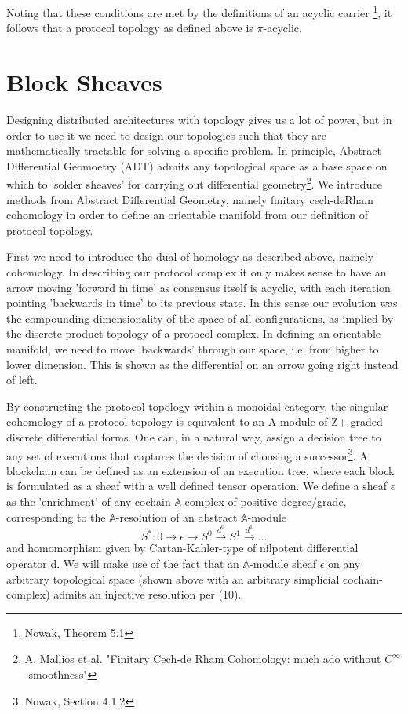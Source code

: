 \documentclass{article}
\begin{document}
Noting that these conditions are met by the definitions of an acyclic carrier \footnote{Nowak, Theorem 5.1}, it follows that a protocol topology as defined above is $\pi$-acyclic.

\section{Block Sheaves}
Designing distributed architectures with topology gives us a lot of power, but in order to use it we need to design our topologies such that they are mathematically tractable for solving a specific problem. In principle, Abstract Differential Geomoetry (ADT) admits any topological space as a base space on which to 'solder sheaves' for carrying out differential geometry\footnote{A. Mallios et al. "Finitary Cech-de Rham Cohomology: much ado without $C^{\infty}$-smoothness"}. We introduce methods from Abstract Differential Geometry, namely finitary cech-deRham cohomology in order to define an orientable manifold from our definition of protocol topology.

First we need to introduce the dual of homology as described above, namely cohomology. In describing our protocol complex it only makes sense to have an arrow moving 'forward in time' as consensus itself is acyclic, with each iteration pointing 'backwards in time' to its previous state. In this sense our evolution was the compounding dimensionality of the space of all configurations, as implied by the discrete product topology of a protocol complex. In defining an orientable manifold, we need to move 'backwards' through our  space, i.e. from higher to lower dimension. This is shown as the differential on an arrow going right instead of left.

By constructing the protocol topology within a monoidal category, the singular cohomology of a protocol topology is equivalent to an A-module of Z+-graded discrete differential forms. One can, in a natural way, assign a decision tree to any set of executions that captures the decision of choosing a successor\footnote{Nowak, Section 4.1.2}. A blockchain can be defined as an extension of an execution tree, where each block is formulated as a sheaf with a well defined tensor operation. We define a sheaf $\epsilon$ as the 'enrichment' of any cochain $\mathbb{A}$-complex of positive degree/grade, corresponding to the $\mathbb{A}$-resolution of an abstract $\mathbb{A}$-module
\begin{equation} \label{eq1}
S^*: 0 \rightarrow \epsilon \rightarrow S^0 \xrightarrow{d^0} S^1 \xrightarrow{d^1} \dots
\end{equation} \label{eq1}
and homomorphism given by  Cartan-Kahler-type of nilpotent differential operator d. We will make use of the fact that an $\mathbb{A}$-module sheaf $\epsilon$ on any arbitrary topological space (shown above with an arbitrary simplicial cochain-complex) admits an injective resolution per (10).
\end{document}
